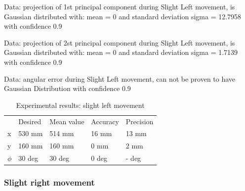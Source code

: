 \documentclass[a4paper, 12pt]{article}
\begin{document}
Data: projection of 1st principal component during  Slight Left movement, is Gaussian distributed with: mean = 0 and standard deviation sigma = 12.7958 with confidence 0.9%



\smallskip

Data: projection of 2st principal component during  Slight Left movement, is Gaussian distributed with: mean = 0 and standard deviation sigma = 1.7139 with confidence 0.9%



\smallskip


Data:  angular error during   Slight Left movement, can not be proven to have Gaussian Distribution with confidence 0.9%

\begin{table}[!h]
\centering
\caption{Experimental results: slight left movement}
\begin{tabular}{lllll}
     & Desired & Mean value & Accuracy & Precision \\
x    &  530  mm     &    514  mm      &    16  mm    &     13  mm    \\
y    &  160 mm     &     160  mm     &  0    mm    &    2   mm    \\
$\phi$ &  30   deg    &     30    deg   &     0 deg     & - deg
\end{tabular}
\end{table}

\newpage
\subsubsection{Slight right movement}
\end{document}
